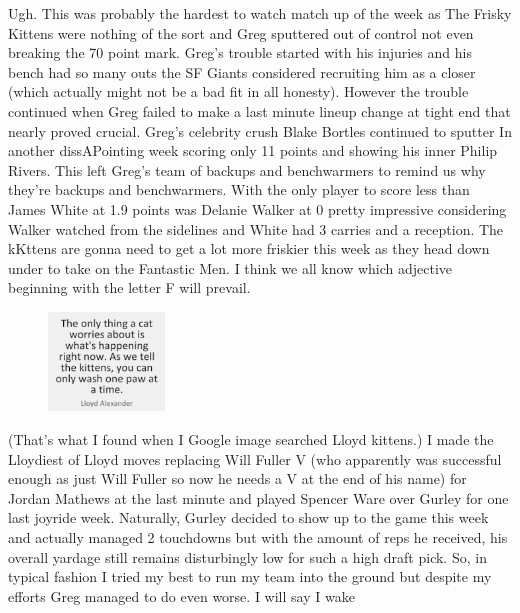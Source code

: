 \documentclass[11pt,letterpaper]{article}
\begin{document}
\newpage
{}
\par\noindent Ugh. This was probably the hardest to watch match up of the week as The Frisky Kittens were nothing of the sort and Greg sputtered out of control not even breaking the 70 point mark. Greg's trouble started with his injuries and his bench had so many outs the SF Giants considered recruiting him as a closer (which actually might not be a bad fit in all honesty). However the trouble continued when Greg failed to make a last minute lineup change at tight end that nearly proved crucial. Greg's celebrity crush Blake Bortles continued to sputter In another dissAPointing week scoring only 11 points and showing his inner Philip Rivers. This left Greg's team of backups and benchwarmers to remind us why they're backups and benchwarmers. With the only player to score less than James White at 1.9 points was Delanie Walker at 0 pretty impressive considering Walker watched from the sidelines and White had 3 carries and a reception. The kKttens are gonna need to get a lot more friskier this week as they head down under to take on the Fantastic Men. I think we all know which adjective beginning with the letter F will prevail.
\begin{figure}
\centering
\includegraphics[width=0.275\textwidth]{week3-lloyd.png}
\label{fig:week3-lloyd}
\end{figure} 
\bigskip
\par\noindent (That's what I found when I Google image searched Lloyd kittens.) I made the Lloydiest of Lloyd moves replacing Will Fuller V (who apparently was successful enough as just Will Fuller so now he needs a V at the end of his name) for Jordan Mathews at the last minute and played Spencer Ware over Gurley for one last joyride week. Naturally, Gurley decided to show up to the game this week and actually managed 2 touchdowns but with the amount of reps he received, his overall yardage still remains disturbingly low for such a high draft pick. So, in typical fashion I tried my best to run my team into the ground but despite my efforts Greg managed to do even worse. I will say I wake 
\end{document}
